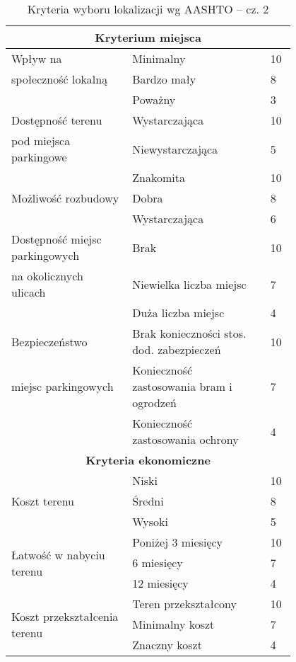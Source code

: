     \begin{table}[H]
    \singlespacing
  	\centering
  	\caption{Kryteria wyboru lokalizacji wg AASHTO -- cz. 2}
    
    \begin{tabular}{p{0.35\linewidth} p{0.4\linewidth} p{0.05\linewidth}} 
    \multicolumn{3}{c}{\textbf{Kryterium miejsca}} \bigstrut\\
    \hline
    Wpływ na   & Minimalny  & 10 \bigstrut[t]\\
    społeczność lokalną & Bardzo mały & 8 \\
               & Poważny    & 3 \bigstrut[b]\\
    \hline
    Dostępność terenu  & Wystarczająca & 10 \bigstrut[t]\\
    pod miejsca parkingowe & Niewystarczająca & 5 \bigstrut[b]\\
    \hline
    \multirow{3}[2]{*}{Możliwość rozbudowy} & Znakomita  & 10 \bigstrut[t]\\
               & Dobra      & 8 \\
               & Wystarczająca & 6 \bigstrut[b]\\
    \hline
    Dostępność miejsc parkingowych  & Brak       & 10 \bigstrut[t]\\
    na okolicznych ulicach & Niewielka liczba miejsc & 7 \\
               & Duża liczba miejsc & 4 \bigstrut[b]\\
    \hline
    Bezpieczeństwo  & Brak konieczności stos. dod. zabezpieczeń & 10 \bigstrut[t]\\
    miejsc parkingowych & Konieczność zastosowania bram i ogrodzeń & 7 \\
               & Konieczność zastosowania ochrony & 4 \bigstrut[b]\\
    \hline
    \multicolumn{3}{c}{\textbf{Kryteria ekonomiczne}} \bigstrut\\
    \hline
    \multirow{3}[2]{*}{Koszt terenu} & Niski      & 10 \bigstrut[t]\\
               & Średni     & 8 \\
               & Wysoki     & 5 \bigstrut[b]\\
    \hline
    \multirow{3}[2]{*}{Łatwość w nabyciu terenu} & Poniżej 3 miesięcy & 10 \bigstrut[t]\\
               & 6 miesięcy & 7 \\
               & 12 miesięcy & 4 \bigstrut[b]\\
    \hline
    \multirow{3}[2]{*}{Koszt przekształcenia terenu} & Teren przekształcony & 10 \bigstrut[t]\\
               & Minimalny koszt & 7 \\
               & Znaczny koszt & 4 \bigstrut[b]\\
    \hline

    \end{tabular}%

  \label{aashto_tab2}%
\end{table}%
\onehalfspacing
